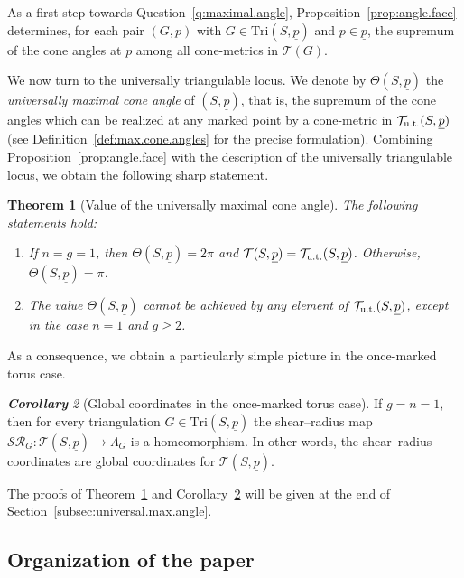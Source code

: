\documentclass[11pt, letterpaper]{amsart}
\newtheorem{theorem}{\rm\bf Theorem}[section]
\theoremstyle{definition}
\theoremstyle{remark}
\newtheorem{corollary}[theorem]{\rm\bf Corollary}
\newcommand{\up}{\underline{p}}
\newcommand{\Sp}{(S,\up)}
\newcommand{\TSp}{\text{Tri}\Sp}
\newcommand{\cSR}{\mathcal{SR}}
\newcommand{\cT}{\mathcal{T}}
\newcommand{\cTp}{\mathcal{T} (S,\up)}
\numberwithin{equation}{section}
\begin{document}
As a first step towards Question~\ref{q:maximal.angle},
Proposition~\ref{prop:angle.face} determines, for each pair \((G,p)\) with
\(G\in\TSp\) and \(p\in\up\), the supremum of the cone angles at \(p\) among all
cone-metrics in \(\cT(G)\).


We now turn to the universally triangulable locus. We denote by \(\Theta\Sp\) the \emph{universally maximal cone angle} of \(\Sp\), that is, the supremum of the cone angles which can be realized at any marked point by a cone-metric in \(\cT_{\rm u.t.}(S,\up)\) (see Definition~\ref{def:max.cone.angles} for the precise formulation).
Combining Proposition~\ref{prop:angle.face} with the description of the universally triangulable locus, we obtain the following sharp statement.

\begin{theorem}[Value of the universally maximal cone angle]\label{thm:adm.cone.angle}
The following statements hold:
\begin{enumerate}
  \item If \(n = g = 1\), then \(\Theta\Sp = 2\pi\) and \(\cTp = \cT_{\rm u.t.}(S,\up)\).  Otherwise, \(\Theta\Sp = \pi\).
  \item The value \(\Theta\Sp\) cannot be achieved by any element of \(\cT_{\rm u.t.}(S,\up)\), except in the case \(n = 1\) and \(g \ge 2\).
\end{enumerate}
\end{theorem}

As a consequence, we obtain a particularly simple picture in the once-marked torus case.

\begin{corollary}[Global coordinates in the once-marked torus case]
\label{cor:once.punctured.torus.global}
If \(g = n = 1\), then for every triangulation \(G \in \TSp\) the shear--radius map \(\cSR_G : \cTp \longrightarrow \Lambda_G \) is a homeomorphism.  
In other words, the shear--radius coordinates are global coordinates for \(\cT(S,\underline{p})\).
\end{corollary}

The proofs of Theorem~\ref{thm:adm.cone.angle} and Corollary~\ref{cor:once.punctured.torus.global} will be given at the end of Section~\ref{subsec:universal.max.angle}.




 
\subsection{Organization of the paper}
\label{subsec:outline}
\end{document}
